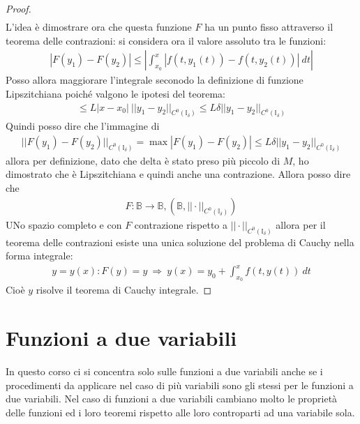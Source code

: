 \documentclass[a4paper, oneside]{book}
\begin{document}
\begin{proof}
\begin{gather*}
    \end{gather*} 
    L'idea è dimostrare ora che questa funzione $F$ ha un punto fisso attraverso il
    teorema delle contrazioni: si considera ora il valore assoluto tra le funzioni:
    \begin{gather*}
        |F(y_1) - F(y_2)| \leq \left| \int_{x_0}^{x}\left|f(t, y_1(t))  - f(t, y_2(t))\right| \ dt\right| 
    \end{gather*}
    Posso allora maggiorare l'integrale seconodo la definizione di funzione Lipszitchiana poiché
    valgono le ipotesi del teorema:
    \begin{gather*}
        \leq L|x - x_0| \ ||y_1 - y_2||_{C^{0}(\mathbb{I}_\delta) } \leq L\delta ||y_1 - y_2||_{C^{0}(\mathbb{I}_\delta) }
    \end{gather*}
    Quindi posso dire che l'immagine di
    \begin{gather*}
        ||F(y_1) - F(y_2)||_{C^{0}(\mathbb{I}_\delta) } = \max \left| F(y_1) - F(y_2) \right| \leq L\delta ||y_1 - y_2||_{C^{0}(\mathbb{I}_\delta) } 
    \end{gather*}
    allora per definizione, dato che delta è stato preso più piccolo di $M$, ho dimostrato che
    è Lipszitchiana e quindi anche una contrazione. 
    Allora posso dire che
    \begin{gather*}
        F: \mathbb{B} \to \mathbb{B}, (\mathbb{B}, ||\cdot ||_{C^{0}(\mathbb{I}_\delta) })
    \end{gather*}
    UNo spazio completo e con $F$ contrazione rispetto a $||\cdot ||_{C^{0}(\mathbb{I}_\delta) }$ allora per il teorema
    delle contrazioni esiste una unica soluzione del problema di Cauchy nella forma integrale:
    \begin{gather*}
        y = y(x) : F(y) = y \ \Longrightarrow \ y(x) = y_0 + \int_{x_0}^{x}f(t, y(t))\ dt
    \end{gather*}
    Cioè $y$ risolve il teorema di Cauchy integrale.
\end{proof}



\chapter{Funzioni a due variabili}
In questo corso ci si concentra solo sulle funzioni a due variabili anche
se i procedimenti da applicare nel caso di più variabili sono gli stessi per
le funzioni a due variabili. Nel caso di funzioni a due variabili cambiano
molto le proprietà delle funzioni ed i loro teoremi rispetto alle loro
controparti ad una variabile sola.  
\end{document}
